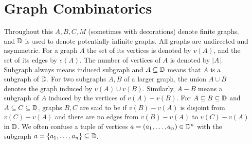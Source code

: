 \section{Graph Combinatorics}
Throughout this \chapa $A, B, C, M$ (sometimes with decorations) denote finite graphs,
and $\mathbb D$ is used to denote potentially infinite graphs.
All graphs are undirected and asymmetric.
For a graph $A$ the set of its vertices is denoted by $v(A)$, and the set of its edges by $e(A)$.
The number of vertices of $A$ is denoted by $|A|$.
Subgraph always means induced subgraph and $A \subseteq \mathbb D$ means that $A$ is a subgraph of $\mathbb D$.
For two subgraphs $A, B$ of a larger graph, the union $A \cup B$ denotes the graph induced by $v(A) \cup v(B)$.
Similarly, $A - B$ means a subgraph of $A$ induced by the vertices of $v(A) - v(B)$.
For $A \subseteq B \subseteq \mathbb D$ and $A \subseteq C \subseteq \mathbb D$,
graphs $B,C$ are said to be  if $v(B) - v(A)$ is disjoint from $v(C) - v(A)$
and there are no edges from $v(B) - v(A)$ to $v(C) - v(A)$ in $\mathbb D$.
We often confuse a tuple of vertices $a = (a_1, \ldots, a_n) \in \mathbb D^n$ with the subgraph $a = \left\{a_1, \ldots, a_n\right\} \subseteq \mathbb D$.

